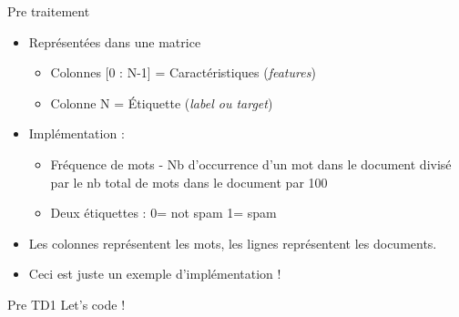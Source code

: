 \documentclass[aspectratio=169,xcolor=dvipsnames, t]{beamer}
\begin{document}
\begin{frame}{Pre traitement}
	\begin{itemize}
		\item Représentées dans une matrice 
		\begin{itemize}
			\item Colonnes [0 : N-1] = Caractéristiques (\textit{features})
			\item Colonne N = Étiquette (\textit{label ou target})
		\end{itemize} 
		\item Implémentation :
		\begin{itemize}
			\item Fréquence de mots - Nb d'occurrence d'un mot dans le document divisé par le nb total de mots dans le document par 100
			\item Deux étiquettes : 0= not spam 1= spam
		\end{itemize} 
		\item Les colonnes représentent les mots, les lignes représentent les documents.
		\item Ceci est juste un exemple d’implémentation !
	\end{itemize}
	
\end{frame}


\begin{frame}{Pre TD1}
	Let's code !
	
\end{frame}


\end{document}
